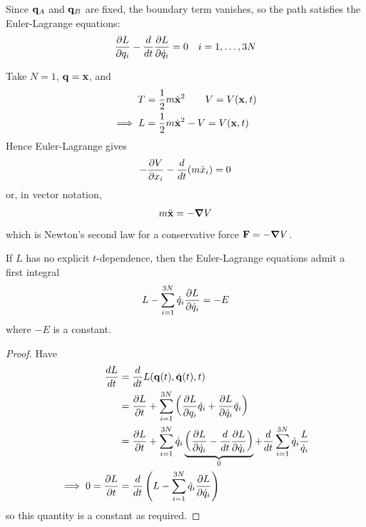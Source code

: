 \documentclass{../template/note}
\begin{document}
    Since $\V q_A$ and $\V q_B$ are fixed, the boundary term vanishes, so the path satisfies the Euler-Lagrange equations:
    \begin{align*}
        \pd{L}{q_i} - \frac{d}{dt} \pd{L}{\dot q_i} = 0 && i = 1, \dots, 3N
    \end{align*}
    
    \begin{example*}
        Take $N=1$, $\V q = \V x$, and
        \begin{align*}
            T &= \frac 1 2 m \dot{\V x}^2 \qquad V = V(\V x, t) \\
            \implies L &= \frac 1 2 m \dot{\V x}^2 - V = V(\V x, t)
        \end{align*}
        Hence Euler-Lagrange gives
        \begin{align*}
            -\pd{V}{x_i} - \frac{d}{dt}(m \dot x_i) = 0
        \end{align*}
        or, in vector notation,
        \begin{align*}
            m \ddot{\V x} = -\grad V
        \end{align*}
        which is Newton's second law for a conservative force $\V F = -\grad V$.  
    \end{example*}
    
    \begin{proposition}
        If $L$ has no explicit $t$-dependence, then the Euler-Lagrange equations admit a first integral
        \begin{align*}
            L - \sum_{i=1}^{3N} \dot q_i \pd{L}{\dot q_i} = -E
        \end{align*}
        where $-E$ is a constant.        
    \end{proposition}
    
    \begin{proof}
        Have
        \begin{align*}
            \frac{dL}{dt} &= \frac{d}{dt} L(\V q(t), \dot{\V q}(t), t) \\
            &= \pd{L}{t} + \sum_{i=1}^{3N} \left(\pd{L}{q_i}\dot q_i + \pd{L}{\dot q_i} \ddot q_i \right) \\
            &= \pd{L}{t} + \sum_{i=1}^{3N} \dot q_i \underbrace{\left(\pd{L}{\dot q_i} - \frac{d}{dt} \pd{L}{\dot q_i}\right)}_0 + \frac{d}{dt} \sum_{i=1}^{3N} \dot q_i \frac{L}{\dot q_i} \\
            \implies 0 = \pd{L}{t} &= \frac{d}{dt} \left(L - \sum_{i=1}^{3N} \dot q_i \pd{L}{\dot q_i}\right)
        \end{align*}
        so this quantity is a constant as required.        
    \end{proof}
    
\end{document}
